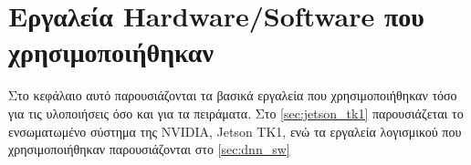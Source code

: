 \chapter{Εργαλεία Hardware/Software που χρησιμοποιήθηκαν}
\label{chapter:tools}

Στο κεφάλαιο αυτό παρουσιάζονται τα βασικά εργαλεία που
χρησιμοποιήθηκαν τόσο για τις υλοποιήσεις όσο και για τα πειράματα.
Στο \autoref{sec:jetson_tk1} παρουσιάζεται το ενσωματωμένο σύστημα
της NVIDIA, Jetson TK1, ενώ τα εργαλεία λογισμικού που χρησιμοποιήθηκαν
παρουσιάζονται στο \autoref{sec:dnn_sw}




